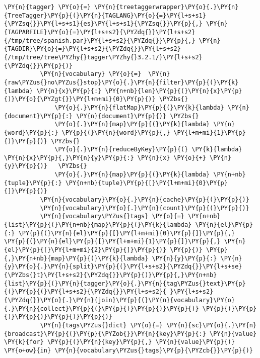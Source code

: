               \begin{tcolorbox}[breakable, size=fbox, boxrule=1pt, pad at break*=1mm,colback=cellbackground, colframe=cellborder]
          \begin{Verbatim}[commandchars=\\\{\}]
          \PY{n}{tagger} \PY{o}{=} \PY{n}{treetaggerwrapper}\PY{o}{.}\PY{n}{TreeTagger}\PY{p}{(}\PY{n}{TAGLANG}\PY{o}{=}\PY{l+s+s1}{\PYZsq{}}\PY{l+s+s1}{es}\PY{l+s+s1}{\PYZsq{}}\PY{p}{,} \PY{n}{TAGPARFILE}\PY{o}{=}\PY{l+s+s2}{\PYZdq{}}\PY{l+s+s2}{/tmp/tree/spanish.par}\PY{l+s+s2}{\PYZdq{}}\PY{p}{,} \PY{n}{TAGDIR}\PY{o}{=}\PY{l+s+s2}{\PYZdq{}}\PY{l+s+s2}{/tmp/tree/tree\PYZhy{}tagger\PYZhy{}3.2.1/}\PY{l+s+s2}{\PYZdq{}}\PY{p}{)}          
          \PY{n}{vocabulary} \PY{o}{=}  \PY{n}{raw\PYZus{}no\PYZus{}stop}\PY{o}{.}\PY{n}{filter}\PY{p}{(}\PY{k}{lambda} \PY{n}{x}\PY{p}{:} \PY{n+nb}{len}\PY{p}{(}\PY{n}{x}\PY{p}{)}\PY{o}{\PYZgt{}}\PY{l+m+mi}{0}\PY{p}{)} \PYZbs{}
              \PY{o}{.}\PY{n}{flatMap}\PY{p}{(}\PY{k}{lambda} \PY{n}{document}\PY{p}{:} \PY{n}{document}\PY{p}{)} \PYZbs{}
              \PY{o}{.}\PY{n}{map}\PY{p}{(}\PY{k}{lambda} \PY{n}{word}\PY{p}{:} \PY{p}{(}\PY{n}{word}\PY{p}{,} \PY{l+m+mi}{1}\PY{p}{)}\PY{p}{)} \PYZbs{}
              \PY{o}{.}\PY{n}{reduceByKey}\PY{p}{(} \PY{k}{lambda} \PY{n}{x}\PY{p}{,}\PY{n}{y}\PY{p}{:} \PY{n}{x} \PY{o}{+} \PY{n}{y}\PY{p}{)}   \PYZbs{}
              \PY{o}{.}\PY{n}{map}\PY{p}{(}\PY{k}{lambda} \PY{n+nb}{tuple}\PY{p}{:} \PY{n+nb}{tuple}\PY{p}{[}\PY{l+m+mi}{0}\PY{p}{]}\PY{p}{)} 
          \PY{n}{vocabulary}\PY{o}{.}\PY{n}{cache}\PY{p}{(}\PY{p}{)}
          \PY{n}{vocabulary}\PY{o}{.}\PY{n}{count}\PY{p}{(}\PY{p}{)}
          \PY{n}{vocabulary\PYZus{}tags} \PY{o}{=} \PY{n+nb}{list}\PY{p}{(}\PY{n+nb}{map}\PY{p}{(}\PY{k}{lambda} \PY{n}{el}\PY{p}{:} \PY{p}{(}\PY{n}{el}\PY{p}{[}\PY{l+m+mi}{0}\PY{p}{]}\PY{p}{,} \PY{p}{(}\PY{n}{el}\PY{p}{[}\PY{l+m+mi}{1}\PY{p}{]}\PY{p}{,} \PY{n}{el}\PY{p}{[}\PY{l+m+mi}{2}\PY{p}{]}\PY{p}{)} \PY{p}{)} \PY{p}{,}\PY{n+nb}{map}\PY{p}{(}\PY{k}{lambda} \PY{n}{y}\PY{p}{:} \PY{n}{y}\PY{o}{.}\PY{n}{split}\PY{p}{(}\PY{l+s+s2}{\PYZdq{}}\PY{l+s+se}{\PYZbs{}t}\PY{l+s+s2}{\PYZdq{}}\PY{p}{)}\PY{p}{,}\PY{n+nb}{list}\PY{p}{(}\PY{n}{tagger}\PY{o}{.}\PY{n}{tag\PYZus{}text}\PY{p}{(}\PY{p}{(}\PY{l+s+s2}{\PYZdq{}}\PY{l+s+s2}{ }\PY{l+s+s2}{\PYZdq{}}\PY{o}{.}\PY{n}{join}\PY{p}{(}\PY{n}{vocabulary}\PY{o}{.}\PY{n}{collect}\PY{p}{(}\PY{p}{)}\PY{p}{)}\PY{p}{)} \PY{p}{)}\PY{p}{)}\PY{p}{)}\PY{p}{)}\PY{p}{)}
          \PY{n}{tags\PYZus{}dict} \PY{o}{=} \PY{n}{sc}\PY{o}{.}\PY{n}{broadcast}\PY{p}{(}\PY{p}{\PYZob{}}\PY{n}{key}\PY{p}{:} \PY{n}{value} \PY{k}{for} \PY{p}{(}\PY{n}{key}\PY{p}{,} \PY{n}{value}\PY{p}{)} \PY{o+ow}{in} \PY{n}{vocabulary\PYZus{}tags}\PY{p}{\PYZcb{}}\PY{p}{)}
          \end{Verbatim}
          \end{tcolorbox}
          
